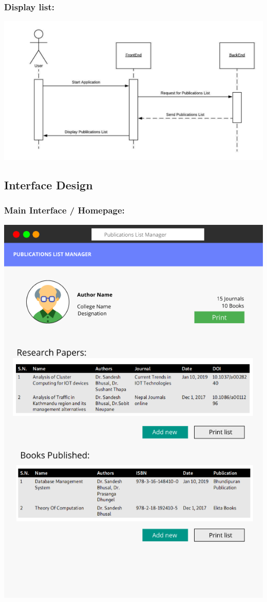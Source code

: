 \documentclass[12pt]{extarticle}
\begin{document}
		\subsubsection{Display list:}
		\includegraphics[scale=0.7]{seq/display_list}
		
		
	\newpage
	\subsection{Interface Design}
		\subsubsection{Main Interface / Homepage:}
			\includegraphics[scale=.7]{main_interface}
			
\end{document}

